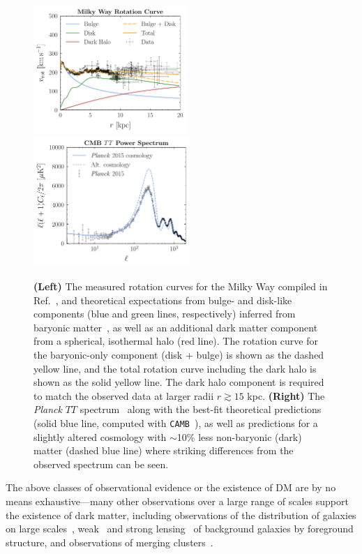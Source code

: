 \begin{figure}[htbp] 
\hspace{-0.9 cm} 
\includegraphics[width=0.5185\textwidth]{ch-intro/rotcurves.pdf}
 \includegraphics[width=0.528\textwidth]{ch-intro/cells.pdf}  
\caption{\textbf{(Left)} The measured rotation curves for the Milky Way compiled in Ref.~\cite{2009PASJ...61..227S}, and theoretical expectations from bulge- and disk-like components (blue and green lines, respectively) inferred from baryonic matter~\cite{2009PASJ...61..227S}, as well as an additional dark matter component from a spherical, isothermal halo (red line). The rotation curve for the baryonic-only component (disk + bulge) is shown as the dashed yellow line, and the total rotation curve including the dark halo is shown as the solid yellow line. The dark halo component is required to match the observed data at larger radii $r \gtrsim 15$ kpc. \textbf{(Right)} The \emph{Planck} $TT$ spectrum~\cite{Ade:2015xua} along with the best-fit theoretical predictions (solid blue line, computed with \texttt{CAMB}~\cite{Lewis:1999bs}), as well as predictions for a slightly altered cosmology with $\sim$10\% less non-baryonic (dark) matter (dashed blue line) where  striking differences from the observed spectrum can be seen.}  
\label{fig:evidence}
\end{figure}

The above classes of observational evidence or the existence of DM are by no means exhaustive---many other observations over a large range of scales support the existence of dark matter, including observations of the distribution of galaxies on large scales~\cite{Alam:2016hwk}, weak~\cite{Abbott:2017wau} and strong lensing~\cite{2010MNRAS.408.1969V,2012Natur.481..341V} of background galaxies by foreground structure, and observations of merging clusters~\cite{Clowe:2006eq}.

